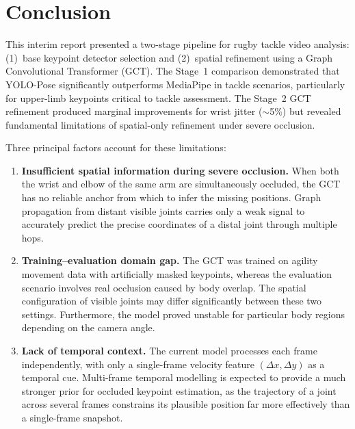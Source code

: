 \documentclass{article}
\begin{document}
\section{Conclusion}
\label{sec:conclusion}

This interim report presented a two-stage pipeline for rugby tackle
video analysis: (1)~base keypoint detector selection and
(2)~spatial refinement using a Graph Convolutional Transformer (GCT).
The Stage~1 comparison demonstrated that YOLO-Pose significantly
outperforms MediaPipe in tackle scenarios, particularly for upper-limb
keypoints critical to tackle assessment.
The Stage~2 GCT refinement produced marginal improvements for wrist
jitter ($\sim$5\%) but revealed fundamental limitations of spatial-only
refinement under severe occlusion.

Three principal factors account for these limitations:
\begin{enumerate}[label=(\alph*)]
  \item \textbf{Insufficient spatial information during severe
  occlusion.}
  When both the wrist and elbow of the same arm are simultaneously
  occluded, the GCT has no reliable anchor from which to infer the
  missing positions.
  Graph propagation from distant visible joints carries only a weak
  signal to accurately predict the precise coordinates of a distal
  joint through multiple hops.

  \item \textbf{Training--evaluation domain gap.}
  The GCT was trained on agility movement data with artificially masked
  keypoints, whereas the evaluation scenario involves real occlusion
  caused by body overlap.
  The spatial configuration of visible joints may differ significantly
  between these two settings.
  Furthermore, the model proved unstable for particular body regions
  depending on the camera angle.

  \item \textbf{Lack of temporal context.}
  The current model processes each frame independently, with only a
  single-frame velocity feature $(\Delta x, \Delta y)$ as a temporal
  cue.
  Multi-frame temporal modelling is expected to provide a much stronger
  prior for occluded keypoint estimation, as the trajectory of a joint
  across several frames constrains its plausible position far more
  effectively than a single-frame snapshot.
\end{enumerate}
\end{document}
